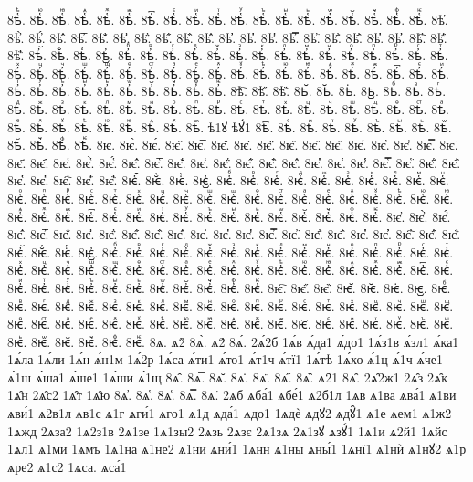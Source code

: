 {8ѣ҅ⷺ.
8ѣ҅ⷻ.
8ѣ҅ⷼ.
8ѣ҅ⷽ.
8ѣ҅ⷾ.
8ѣ҅ⷿ.
8ѣ҅꙯.
8ѣ҅ꙴ.
8ѣ҅ꙵ.
8ѣ҅ꙶ.
8ѣ҅ꙷ.
8ѣ҅ꙸ.
8ѣ҅ꙹ.
8ѣ҅ꙺ.
8ѣ҅ꙻ.
8ѣ҅꙼.
8ѣ҅꙽.
8ѣ҅ꚞ.
8ѣ҅ꚟ.
8ѣ҆.
8ѣ҆̀.
8ѣ҆́.
8ѣ҆̂.
8ѣ҆̅.
8ѣ҆̆.
8ѣ҆̇.
8ѣ҆̈.
8ѣ҆̋.
8ѣ҆̏.
8ѣ҆̑.
8ѣ҆̓.
8ѣ҆̔.
8ѣ҆̾.
8ѣ҆̿.
8ѣ҆͘.
8ѣ҆҃.
8ѣ҆҄.
8ѣ҆҅.
8ѣ҆҆.
8ѣ҆҇.
8ѣ҆᷀.
8ѣ҆᷁.
8ѣ҆᷶.
8ѣ᷷҆.
8ѣ᷸҆.
8ѣ᷹҆.
8ѣ҆ⷠ.
8ѣ҆ⷡ.
8ѣ҆ⷢ.
8ѣ҆ⷣ.
8ѣ҆ⷤ.
8ѣ҆ⷥ.
8ѣ҆ⷦ.
8ѣ҆ⷧ.
8ѣ҆ⷨ.
8ѣ҆ⷩ.
8ѣ҆ⷪ.
8ѣ҆ⷫ.
8ѣ҆ⷬ.
8ѣ҆ⷭ.
8ѣ҆ⷮ.
8ѣ҆ⷯ.
8ѣ҆ⷰ.
8ѣ҆ⷱ.
8ѣ҆ⷲ.
8ѣ҆ⷳ.
8ѣ҆ⷴ.
8ѣ҆ⷵ.
8ѣ҆ⷶ.
8ѣ҆ⷷ.
8ѣ҆ⷸ.
8ѣ҆ⷹ.
8ѣ҆ⷺ.
8ѣ҆ⷻ.
8ѣ҆ⷼ.
8ѣ҆ⷽ.
8ѣ҆ⷾ.
8ѣ҆ⷿ.
8ѣ҆꙯.
8ѣ҆ꙴ.
8ѣ҆ꙵ.
8ѣ҆ꙶ.
8ѣ҆ꙷ.
8ѣ҆ꙸ.
8ѣ҆ꙹ.
8ѣ҆ꙺ.
8ѣ҆ꙻ.
8ѣ҆꙼.
8ѣ҆꙽.
8ѣ҆ꚞ.
8ѣ҆ꚟ.
8ѣ҇.
8ѣ᷀.
8ѣ᷁.
8ѣ᷶.
8ѣ᷷.
8ѣ᷸.
8ѣ᷹.
8ѣⷠ.
8ѣⷡ.
8ѣⷢ.
8ѣⷣ.
8ѣⷤ.
8ѣⷥ.
8ѣⷦ.
8ѣⷧ.
8ѣⷨ.
8ѣⷩ.
8ѣⷪ.
8ѣⷫ.
8ѣⷬ.
8ѣⷭ.
8ѣⷮ.
8ѣⷯ.
8ѣⷰ.
8ѣⷱ.
8ѣⷲ.
8ѣⷳ.
8ѣⷴ.
8ѣⷵ.
8ѣⷶ.
8ѣⷷ.
8ѣⷸ.
8ѣⷹ.
8ѣⷺ.
8ѣⷻ.
8ѣⷼ.
8ѣⷽ.
8ѣⷾ.
8ѣⷿ.
ѣ1ꙋ
ѣꙋ́1
8ѣ꙯.
8ѣꙴ.
8ѣꙵ.
8ѣꙶ.
8ѣꙷ.
8ѣꙸ.
8ѣꙹ.
8ѣꙺ.
8ѣꙻ.
8ѣ꙼.
8ѣ꙽.
8ѣꚞ.
8ѣꚟ.
8ѥ.
8ѥ̀.
8ѥ́.
8ѥ̂.
8ѥ̅.
8ѥ̆.
8ѥ̇.
8ѥ̈.
8ѥ̋.
8ѥ̏.
8ѥ̑.
8ѥ̓.
8ѥ̔.
8ѥ̾.
8ѥ̿.
8ѥ͘.
8ѥ҃.
8ѥ҄.
8ѥ҅.
8ѥ҅̀.
8ѥ҅́.
8ѥ҅̂.
8ѥ҅̅.
8ѥ҅̆.
8ѥ҅̇.
8ѥ҅̈.
8ѥ҅̋.
8ѥ҅̏.
8ѥ҅̑.
8ѥ҅̓.
8ѥ҅̔.
8ѥ҅̾.
8ѥ҅̿.
8ѥ҅͘.
8ѥ҅҃.
8ѥ҅҄.
8ѥ҅҅.
8ѥ҅҆.
8ѥ҅҇.
8ѥ҅᷀.
8ѥ҅᷁.
8ѥ҅᷶.
8ѥ᷷҅.
8ѥ᷸҅.
8ѥ᷹҅.
8ѥ҅ⷠ.
8ѥ҅ⷡ.
8ѥ҅ⷢ.
8ѥ҅ⷣ.
8ѥ҅ⷤ.
8ѥ҅ⷥ.
8ѥ҅ⷦ.
8ѥ҅ⷧ.
8ѥ҅ⷨ.
8ѥ҅ⷩ.
8ѥ҅ⷪ.
8ѥ҅ⷫ.
8ѥ҅ⷬ.
8ѥ҅ⷭ.
8ѥ҅ⷮ.
8ѥ҅ⷯ.
8ѥ҅ⷰ.
8ѥ҅ⷱ.
8ѥ҅ⷲ.
8ѥ҅ⷳ.
8ѥ҅ⷴ.
8ѥ҅ⷵ.
8ѥ҅ⷶ.
8ѥ҅ⷷ.
8ѥ҅ⷸ.
8ѥ҅ⷹ.
8ѥ҅ⷺ.
8ѥ҅ⷻ.
8ѥ҅ⷼ.
8ѥ҅ⷽ.
8ѥ҅ⷾ.
8ѥ҅ⷿ.
8ѥ҅꙯.
8ѥ҅ꙴ.
8ѥ҅ꙵ.
8ѥ҅ꙶ.
8ѥ҅ꙷ.
8ѥ҅ꙸ.
8ѥ҅ꙹ.
8ѥ҅ꙺ.
8ѥ҅ꙻ.
8ѥ҅꙼.
8ѥ҅꙽.
8ѥ҅ꚞ.
8ѥ҅ꚟ.
8ѥ҆.
8ѥ҆̀.
8ѥ҆́.
8ѥ҆̂.
8ѥ҆̅.
8ѥ҆̆.
8ѥ҆̇.
8ѥ҆̈.
8ѥ҆̋.
8ѥ҆̏.
8ѥ҆̑.
8ѥ҆̓.
8ѥ҆̔.
8ѥ҆̾.
8ѥ҆̿.
8ѥ҆͘.
8ѥ҆҃.
8ѥ҆҄.
8ѥ҆҅.
8ѥ҆҆.
8ѥ҆҇.
8ѥ҆᷀.
8ѥ҆᷁.
8ѥ҆᷶.
8ѥ᷷҆.
8ѥ᷸҆.
8ѥ᷹҆.
8ѥ҆ⷠ.
8ѥ҆ⷡ.
8ѥ҆ⷢ.
8ѥ҆ⷣ.
8ѥ҆ⷤ.
8ѥ҆ⷥ.
8ѥ҆ⷦ.
8ѥ҆ⷧ.
8ѥ҆ⷨ.
8ѥ҆ⷩ.
8ѥ҆ⷪ.
8ѥ҆ⷫ.
8ѥ҆ⷬ.
8ѥ҆ⷭ.
8ѥ҆ⷮ.
8ѥ҆ⷯ.
8ѥ҆ⷰ.
8ѥ҆ⷱ.
8ѥ҆ⷲ.
8ѥ҆ⷳ.
8ѥ҆ⷴ.
8ѥ҆ⷵ.
8ѥ҆ⷶ.
8ѥ҆ⷷ.
8ѥ҆ⷸ.
8ѥ҆ⷹ.
8ѥ҆ⷺ.
8ѥ҆ⷻ.
8ѥ҆ⷼ.
8ѥ҆ⷽ.
8ѥ҆ⷾ.
8ѥ҆ⷿ.
8ѥ҆꙯.
8ѥ҆ꙴ.
8ѥ҆ꙵ.
8ѥ҆ꙶ.
8ѥ҆ꙷ.
8ѥ҆ꙸ.
8ѥ҆ꙹ.
8ѥ҆ꙺ.
8ѥ҆ꙻ.
8ѥ҆꙼.
8ѥ҆꙽.
8ѥ҆ꚞ.
8ѥ҆ꚟ.
8ѥ҇.
8ѥ᷀.
8ѥ᷁.
8ѥ᷶.
8ѥ᷷.
8ѥ᷸.
8ѥ᷹.
8ѥⷠ.
8ѥⷡ.
8ѥⷢ.
8ѥⷣ.
8ѥⷤ.
8ѥⷥ.
8ѥⷦ.
8ѥⷧ.
8ѥⷨ.
8ѥⷩ.
8ѥⷪ.
8ѥⷫ.
8ѥⷬ.
8ѥⷭ.
8ѥⷮ.
8ѥⷯ.
8ѥⷰ.
8ѥⷱ.
8ѥⷲ.
8ѥⷳ.
8ѥⷴ.
8ѥⷵ.
8ѥⷶ.
8ѥⷷ.
8ѥⷸ.
8ѥⷹ.
8ѥⷺ.
8ѥⷻ.
8ѥⷼ.
8ѥⷽ.
8ѥⷾ.
8ѥⷿ.
8ѥ꙯.
8ѥꙴ.
8ѥꙵ.
8ѥꙶ.
8ѥꙷ.
8ѥꙸ.
8ѥꙹ.
8ѥꙺ.
8ѥꙻ.
8ѥ꙼.
8ѥ꙽.
8ѥꚞ.
8ѥꚟ.
8ѧ.
ѧ2̀
8ѧ̀.
ѧ2́
8ѧ́.
2ѧ́2б
1ѧ́в
ѧ́да1
ѧ́до1
1ѧ́з1в
ѧ́зл1
ѧ́ка1
1ѧ́ла
1ѧ́ли
1ѧ́н
ѧ́н1м
1ѧ́2р
1ѧ́са
ѧ́ти1
ѧ́то1
ѧ́т1ч
ѧ́тї1
1ѧ́тѣ
1ѧ́хо
ѧ́1ц
ѧ́1ч
ѧ́че1
ѧ́1ш
ѧ́ша1
ѧ́ше1
1ѧ́ши
ѧ́1щ
8ѧ̂.
8ѧ̅.
8ѧ̆.
8ѧ̇.
8ѧ̈.
8ѧ̋.
8ѧ̏.
ѧ2̑1
8ѧ̑.
2ѧ̑2ж1
2ѧ̑з
2ѧ̑к
1ѧ̑н
2ѧ̑с2
1ѧ̑т
1ѧ̑ю
8ѧ̓.
8ѧ̔.
8ѧ̾.
8ѧ̿.
8ѧ͘.
2ѧб
ѧба́1
ѧбе́1
ѧ2б1л
1ѧв
ѧ1ва
ѧва́1
ѧ1ви
ѧви́1
ѧ2в1л
ѧв1с
ѧ1г
ѧги́1
ѧго1
ѧ1д
ѧда́1
ѧдо1
1ѧдѐ
ѧдꙋ2
ѧдꙋ̑1
ѧ1е
ѧем1
ѧ1ж2
1ѧжд
2ѧза2
1ѧ2з1в
2ѧ1зе
1ѧ1зы2
2ѧзь
2ѧзє
2ѧ1зѧ
2ѧ1зꙋ
ѧзꙋ́1
1ѧ1и
ѧ2й1
1ѧйс
1ѧл1
ѧ1ми
1ѧмъ
1ѧ1на
ѧ1не2
ѧ1ни
ѧни́1
1ѧнн
ѧ1ны
ѧны́1
1ѧнї1
ѧ1нѝ
ѧ1нꙋ2
ѧ1р
ѧре2
ѧ1с2
1ѧса.
ѧса́1
}
